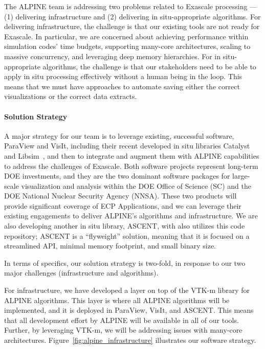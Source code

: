 The ALPINE team is addressing two problems related to Exascale processing --- (1) delivering infrastructure and (2) delivering in situ-appropriate algorithms.
%
For delivering infrastructure, the challenge is that our existing tools are not ready for Exascale.
%
In particular, we are concerned about achieving performance within simulation codes' time budgets, supporting many-core architectures, scaling to massive concurrency, and leveraging deep memory hierarchies.
%
For in situ-appropriate algorithms, the challenge is that our stakeholders need to be able to apply in situ processing effectively without a human being in the loop.
%
This means that we must have approaches to automate saving either the correct visualizations or the correct data extracts.


\paragraph{Solution Strategy}

A major strategy for our team is to leverage existing, successful software, ParaView and VisIt, including their recent developed in situ libraries Catalyst~\cite{Catalyst} and Libsim~\cite{LibSim}, and then to integrate and augment them with ALPINE capabilities to address the challenges of Exascale. 
%
Both software projects represent long-term DOE investments, and they are the two dominant software packages for large-scale visualization and analysis within the DOE Office of Science (SC) and the DOE National Nuclear Security Agency (NNSA). 
%
These two products will provide significant coverage of ECP Applications, and we can leverage their existing engagements to deliver ALPINE's algorithms and infrastructure. 
%
%
We are also developing another in situ library, ASCENT, with also utilizes this code repository; ASCENT is a ``flyweight'' solution,
meaning that it is focused on a streamlined API, minimal memory footprint, and small binary size.

In terms of specifics, our solution strategy is two-fold, in response to our two major challenges (infrastructure and algorithms).

For infrastructure, we have developed a layer on top of the VTK-m library for ALPINE algorithms.
%
This layer is where all ALPINE algorithms will be implemented, and it is deployed in ParaView, VisIt, and ASCENT.
%
This means that all development effort by ALPINE will be available in all of our tools.
%
Further, by leveraging VTK-m, we will be addressing issues with many-core architectures.
%
Figure~\ref{fig:alpine_infrastructure} illustrates our software strategy.

